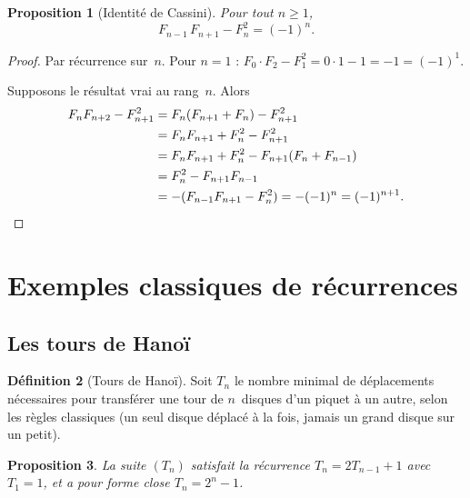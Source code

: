 \documentclass[12pt,a4paper,openany]{book}
\theoremstyle{definition}
\newtheorem{definition}{Définition}[chapter]
\theoremstyle{plain}
\newtheorem{proposition}[definition]{Proposition}
\theoremstyle{remark}
\begin{document}
\begin{proposition}[Identité de Cassini]
\label{prop:cassini}
Pour tout $n \geq 1$,
\[
  F_{n-1}\, F_{n+1} - F_n^2 = (-1)^n.
\]
\end{proposition}

\begin{proof}
Par récurrence sur~$n$. Pour $n = 1$ : $F_0 \cdot F_2 - F_1^2 = 0 \cdot 1 - 1 = -1 = (-1)^1$.

Supposons le résultat vrai au rang~$n$. Alors
\begin{align*}
  F_n F_{n+2} - F_{n+1}^2
  &= F_n(F_{n+1} + F_n) - F_{n+1}^2 \\
  &= F_n F_{n+1} + F_n^2 - F_{n+1}^2 \\
  &= F_n F_{n+1} + F_n^2 - F_{n+1}(F_n + F_{n-1}) \\
  &= F_n^2 - F_{n+1} F_{n-1} \\
  &= -(F_{n-1} F_{n+1} - F_n^2) = -(-1)^n = (-1)^{n+1}. \qedhere
\end{align*}
\end{proof}

\section{Exemples classiques de récurrences}
\label{sec:rec-classiques}

\subsection{Les tours de Hanoï}
\label{subsec:hanoi}

\begin{definition}[Tours de Hanoï]
\label{def:hanoi}
Soit $T_n$ le nombre minimal de déplacements nécessaires pour transférer une tour
de $n$~disques d'un piquet à un autre, selon les règles classiques (un seul disque
déplacé à la fois, jamais un grand disque sur un petit).
\end{definition}

\begin{proposition}
\label{prop:hanoi}
La suite $(T_n)$ satisfait la récurrence $T_n = 2T_{n-1} + 1$ avec $T_1 = 1$,
et a pour forme close $T_n = 2^n - 1$.
\end{proposition}
\end{document}
